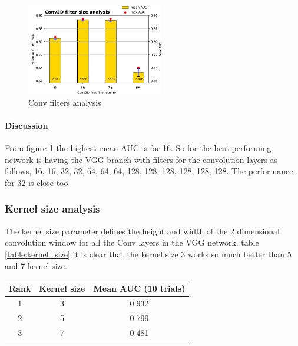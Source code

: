 \begin{figure}[ht]
\centering
\includegraphics[width= 6cm]{images/contrastive/contrastive_loss_con2d_filter_bar}
\caption{Conv filters analysis}
\label{fig:contrastive_loss_con2d_filter_bar}
\end{figure}

\paragraph{Discussion }
From figure \ref{fig:contrastive_loss_con2d_filter_bar} the highest mean AUC is for 16. So for the best performing network is having the VGG branch with filters for the convolution layers as follows, 16, 16, 32, 32, 64, 64, 64, 128, 128, 128, 128, 128, 128.  
The performance for 32 is close too.
\subsubsection{Kernel size analysis}
The kernel size parameter defines the height and width of the 2 dimensional convolution window for all the Conv layers in the VGG network. table \ref{table:kernel_size} it is clear that the kernel size 3 
works so much better than 5 and 7 kernel size. 

\begin{center}
    \begin{tabular}{|c c c|} 
      \hline\hline
      Rank & Kernel size & Mean AUC (10 trials) \\[0.5ex] 
      \hline
      1 & 3 &  0.932\\      
      \hline
      2 & 5 &  0.799\\      
      \hline
      3 & 7 &  0.481\\      
      \hline \hline
    \end{tabular}
  \label{table:kernel_size}
\end{center}

